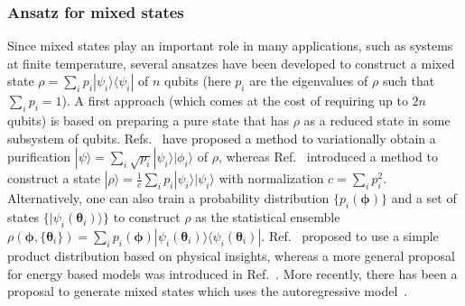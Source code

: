 \documentclass[prx,twocolumn,floatfix,superscriptaddress,longbibliography]{revtex4-1}
\newcommand{\<}{\langle}
\renewcommand{\>}{\rangle}
\newcommand{\ket}[1]{|#1\rangle}               %
\newcommand{\bra}[1]{\langle #1|}              %
\begin{document}
\subsubsection{ Ansatz for mixed states} Since mixed states play an important role in many applications, such as systems at finite temperature, several ansatzes have been developed to construct a mixed state $\rho=\sum_{i}p_i\ket{\psi_i}\bra{\psi_i}$ of $n$ qubits (here $p_i$ are the eigenvalues of $\rho$ such that $\sum_i p_i=1$). A first approach (which comes at the cost of requiring up to $2n$ qubits)  is based on preparing a pure state that has  $\rho$ as a reduced state in some subsystem of qubits.   Refs.~\cite{Liu2019variational, Martyn2019product} have proposed a method to variationally obtain a purification $\ket{\psi}=\sum_i \sqrt{p_i}\ket{\psi_i}\ket{\phi_i}$ of $\rho$, whereas Ref.~\cite{yoshioka2019variational}  introduced a method to construct a state $\ket{\rho}=\frac{1}{c}\sum_{i}p_i \ket{\psi_i}\ket{\psi_i}$ with normalization $c=\sum_{i}p_i^2$. 
Alternatively, one can also train a probability distribution $\{p_i(\bm{\phi})\}$ and a set of states $\{\ket{\psi_i(\bm{\theta}_i)}\}$ to construct $\rho$ as the statistical ensemble $
\rho(\bm{\phi}, \{\bm{\theta}_i\}) = \sum_i p_i(\bm{\phi}) \ket{\psi_i(\bm{\theta}_i)}\bra{\psi_i(\bm{\theta}_i)}$. Ref.~\cite{Martyn2019product} proposed to use a simple product distribution based on physical insights, whereas a more general proposal for energy based models was introduced in Ref.~\cite{verdon2019quantumVQT}.  More recently, there has been a proposal to generate mixed states which uses the autoregressive model~\cite{Liu2020solving}.

  
\end{document}
